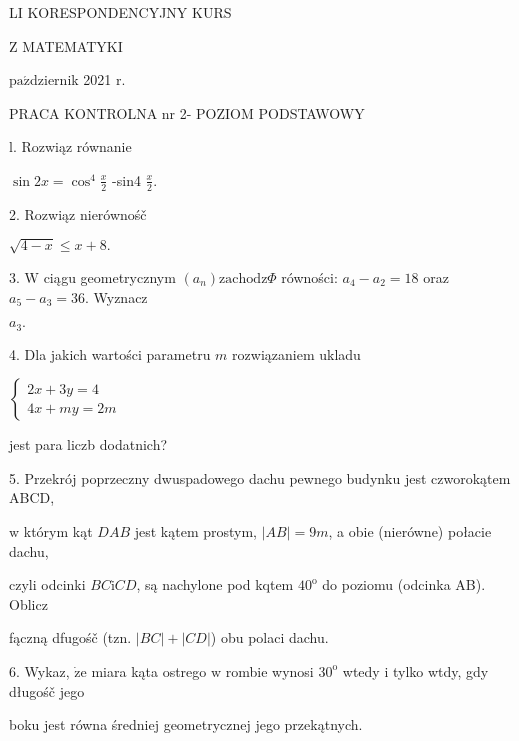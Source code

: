 \documentclass[a4paper,12pt]{article}
\begin{document}
LI KORESPONDENCYJNY KURS

Z MATEMATYKI

$\mathrm{p}\mathrm{a}\acute{\mathrm{z}}$dziernik 2021 $\mathrm{r}.$

PRACA KONTROLNA nr 2- POZIOM PODSTAWOWY

l. Rozwiąz równanie

$\displaystyle \sin 2x=\cos^{4}\frac{x}{2}$ -sin4 $\displaystyle \frac{x}{2}.$

2. Rozwiąz nierównośč

$\sqrt{4-x}\leq x+8.$

3. $\mathrm{W}$ ciągu geometrycznym $(a_{n})\mathrm{z}\mathrm{a}\mathrm{c}\mathrm{h}\mathrm{o}\mathrm{d}\mathrm{z}\Phi$ równości: $a_{4}-a_{2}=18$ oraz $a_{5}-a_{3}=36$. Wyznacz

$a_{3}.$

4. Dla jakich wartości parametru $m$ rozwiązaniem ukladu

$\left\{\begin{array}{l}
2x+3y=4\\
4x+my=2m
\end{array}\right.$

jest para liczb dodatnich?

5. Przekrój poprzeczny dwuspadowego dachu pewnego budynku jest czworokątem ABCD,

$\mathrm{w}$ którym kąt $DAB$ jest kątem prostym, $|AB| =9m$, a obie (nierówne) połacie dachu,

czyli odcinki $BC\mathrm{i}CD$, są nachylone pod kqtem $40^{\mathrm{o}}$ do poziomu (odcinka AB). Oblicz

fączną dfugośč (tzn. $|BC|+|CD|$) obu polaci dachu.

6. Wykaz, $\dot{\mathrm{z}}\mathrm{e}$ miara kąta ostrego $\mathrm{w}$ rombie wynosi $30^{\mathrm{o}}$ wtedy $\mathrm{i}$ tylko wtdy, gdy długośč jego

boku jest równa średniej geometrycznej jego przekątnych.
\end{document}

